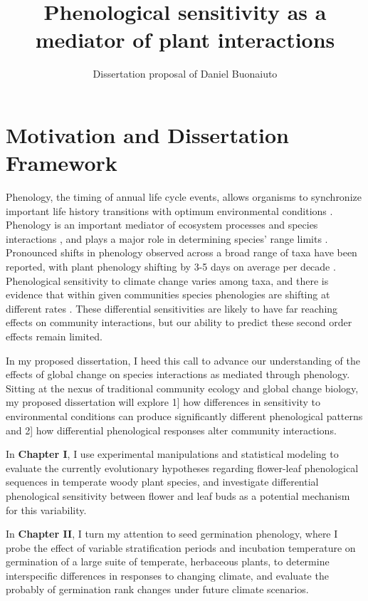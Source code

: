 \documentclass{article}\usepackage[]{graphicx}\usepackage[]{color}
\begin{document}
\title{Phenological sensitivity as a mediator of plant interactions}
\author{Dissertation proposal of Daniel Buonaiuto}
\maketitle{}
\section*{Motivation and Dissertation Framework}
\indent\indent Phenology, the timing of annual life cycle events, allows organisms to synchronize important life history transitions with optimum environmental conditions \citep{Forrest2010}. Phenology is an important mediator of ecosystem processes \citep{Piao2007,Cleland2007} and species interactions \citep{Yang2010,Leverett2017}, and plays a major role in determining species' range limits \citep{Chuine2001}. Pronounced shifts in phenology observed across a broad range of taxa have been reported, with plant phenology shifting by 3-5 days on average per decade \citep{Parmesan2003,Menzel2006,Root2003}. Phenological sensitivity to climate change varies among taxa, and there is evidence that within given communities species phenologies are shifting at different rates \citep{Cleland2012,Ovaskainen2013}. These differential sensitivities are likely to have far reaching effects on community interactions, but our ability to predict these second order effects remain limited.
\par In my proposed dissertation, I heed this call to advance our understanding of the effects of global change on species interactions as mediated through phenology. Sitting at the nexus of traditional community ecology and global change biology, my proposed dissertation will explore 1] how differences in sensitivity to environmental conditions can produce significantly different phenological patterns and 2] how differential phenological responses alter community interactions.
\par In \textbf{Chapter I}, I use experimental manipulations and statistical modeling to evaluate the currently evolutionary hypotheses regarding flower-leaf phenological sequences in temperate woody plant species, and investigate differential phenological sensitivity between flower and leaf buds as a potential mechanism for this variability.
\par In \textbf{Chapter II}, I turn my attention to seed germination phenology, where I probe the effect of variable stratification periods and incubation temperature on germination of a large suite of temperate, herbaceous plants, to determine interspecific differences in responses to changing climate, and evaluate the probably of germination rank changes under future climate scenarios.
\end{document}
